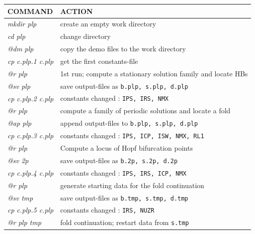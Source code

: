 \documentclass[12pt]{report}
\begin{document}
\begin{table}[htbp]
\begin{center}
\begin{tabular}{| l | l |}
\hline
  COMMAND  & ACTION \\
\hline
  {\it mkdir plp} & create an empty work directory \\ 
  {\it cd plp} & change directory \\
  {\it @dm plp} & copy the demo files to the work directory \\
\hline
  {\it cp c.plp.1 c.plp} & get the first constants-file \\ 
  {\it @r plp} & 1st run; compute a stationary solution family and locate HBs \\ 
  {\it @sv plp} & save output-files as {\tt b.plp, s.plp, d.plp} \\ 
\hline
  {\it cp c.plp.2 c.plp} & constants changed : {\tt IPS, IRS, NMX} \\ 
  {\it @r plp} & compute a family of periodic solutions and locate a fold \\ 
  {\it @ap plp} & append output-files to {\tt b.plp, s.plp, d.plp} \\ 
\hline
  {\it cp c.plp.3 c.plp} & constants changed : {\tt IPS, ICP, ISW, NMX, RL1} \\ 
  {\it @r plp} & Compute a locus of Hopf bifurcation points \\ 
  {\it @sv 2p} & save output-files as {\tt b.2p, s.2p, d.2p} \\ 
\hline
  {\it cp c.plp.4 c.plp} & constants changed : {\tt IPS, IRS, ICP, NMX} \\ 
  {\it @r plp} & generate starting data for the fold continuation \\ 
  {\it @sv tmp} & save output-files as {\tt b.tmp, s.tmp, d.tmp} \\ 
\hline
  {\it cp c.plp.5 c.plp} & constants changed : {\tt IRS, NUZR} \\ 
  {\it @r plp tmp} &  fold continuation; restart data from {\tt s.tmp} \\ 

\end{tabular}
\end{center}
\end{table}
\end{document}
